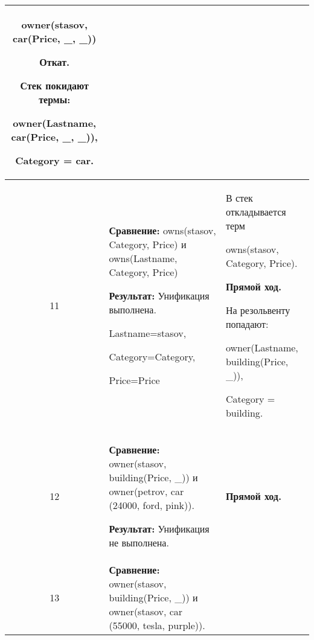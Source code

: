 \begin{longtable}{|c|p{}|p{}|}
  owner(stasov, car(Price, \_, \_))
  \newline

  \textbf{Откат.}
  \newline

  Стек покидают термы:

    owner(Lastname, car(Price, \_, \_)),

    Category = car.
                       \\ \hline

11
                       &
\textbf{Сравнение:}\newline
  owns(stasov, Category, Price)
  \newline{}и\newline
  owns(Lastname, Category, Price)
  \newline

  \textbf{Результат:}\newline
  Унификация выполнена.

  Lastname=stasov,

  Category=Category,

  Price=Price
                       &
  В стек откладывается терм

  owns(stasov, Category, Price).
  \newline

  \textbf{Прямой ход.}
  \newline

  На резольвенту попадают:

    owner(Lastname, building(Price, \_)),

    Category = building.
                       \\ \hline

12
                       &
\textbf{Сравнение:}\newline
  owner(stasov, building(Price, \_))
  \newline{}и\newline
  owner(petrov, car     (24000,    ford,    pink)).
  \newline

  \textbf{Результат:}\newline
  Унификация не выполнена.
                       &
  \textbf{Прямой ход.}
                       \\ \hline

13
                       &
\textbf{Сравнение:}\newline
  owner(stasov, building(Price, \_))
  \newline{}и\newline
  owner(stasov, car     (55000,    tesla,    purple)).
  \newline


\end{longtable}
